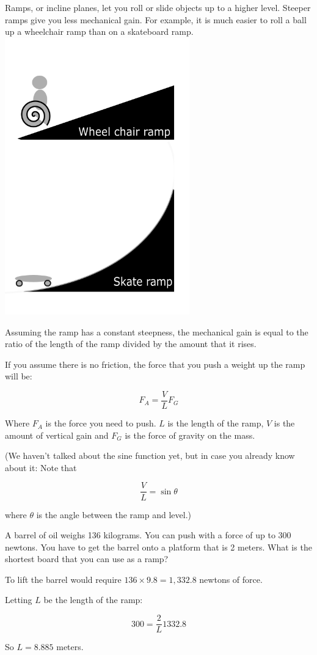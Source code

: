 Ramps, or incline planes, let you roll or slide objects up to a higher
level. Steeper ramps give you less mechanical gain. For example, it is much easier 
to roll a ball up a wheelchair ramp than on a skateboard ramp.
\includegraphics[width=0.6\textwidth]{ramps.png}

Assuming the ramp has a constant steepness, the mechanical gain is
equal to the ratio of the length of the ramp divided by the amount
that it rises.

If you assume there is no friction, the force that you push a weight up the ramp will be:

$$F_A = \frac{V}{L} F_G$$

Where $F_A$ is the force you need to push. $L$ is the length of the
ramp, $V$ is the amount of vertical gain and $F_G$ is the force of
gravity on the mass.

(We haven't talked about the sine function yet, but in case you already know about it: Note that

$$\frac{V}{L} = \sin{\theta}$$

where $\theta$ is the angle between the ramp and level.)

\begin{Exercise}[title={Ramp}, label=ramp]
A barrel of oil weighs 136 kilograms. You can push with a force of
up to 300 newtons. You have to get the barrel onto a platform that is 2
meters. What is the shortest board that you can use as a ramp?
\end{Exercise}
\begin{Answer}[ref=ramp]
  To lift the barrel would require $136 \times 9.8 = 1,332.8$ newtons of force.

  Letting $L$ be the length of the ramp:

  $$300= \frac{2}{L} 1332.8$$

  So $L = 8.885$ meters.
\end{Answer}

